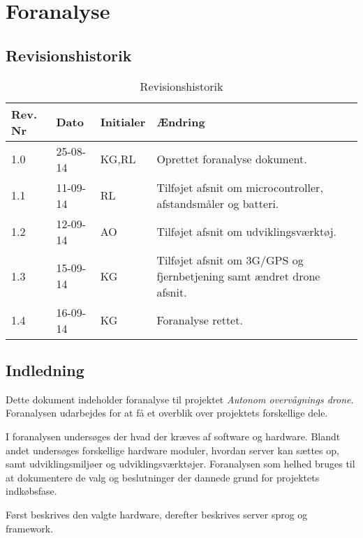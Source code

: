 \chapter{Foranalyse}

\section{Revisionshistorik}
\begin{table}[H]
	\centering
		\begin{tabular}{|p{2 cm}|p{2 cm}|p{2 cm}|p{7 cm}|} 
		\hline
			\textbf{Rev. Nr} & \textbf{Dato}		& \textbf{Initialer} 	& \textbf{Ændring} \\ \hline
			1.0 	& 25-08-14	& KG,RL		& Oprettet foranalyse dokument.	\\ \hline
			1.1 	& 11-09-14	& RL		& Tilføjet afsnit om microcontroller, afstandsmåler og batteri.	\\ \hline
			1.2 	& 12-09-14	& AO		& Tilføjet afsnit om udviklingsværktøj.	\\ \hline	
			1.3 	& 15-09-14	& KG		& Tilføjet afsnit om 3G/GPS og fjernbetjening samt ændret drone afsnit.	\\ \hline
			1.4 	& 16-09-14	& KG		& Foranalyse rettet.	\\ \hline
		\end{tabular}
	\caption{Revisionshistorik}
\end{table}

\vspace{6.5cm}


\section{Indledning}

Dette dokument indeholder foranalyse til projektet \textit{Autonom overvågnings drone}. 
Foranalysen udarbejdes for at få et overblik over projektets forskellige dele. 

I foranalysen undersøges der hvad der kræves af software og hardware. Blandt andet undersøges forskellige hardware moduler, hvordan server kan sættes op, samt udviklingsmiljøer og udviklingsværktøjer. Foranalysen som helhed bruges til at dokumentere de valg og beslutninger der dannede grund for projektets indkøbsfase. 

Først beskrives den valgte hardware, derefter beskrives server sprog og framework.
